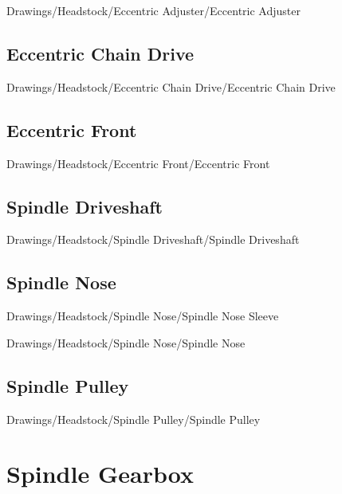
{Drawings/Headstock/Eccentric Adjuster/Eccentric Adjuster}

\subsection{Eccentric Chain Drive}


{Drawings/Headstock/Eccentric Chain Drive/Eccentric Chain Drive}

\subsection{Eccentric Front}


{Drawings/Headstock/Eccentric Front/Eccentric Front}

\subsection{Spindle Driveshaft}


{Drawings/Headstock/Spindle Driveshaft/Spindle Driveshaft}

\subsection{Spindle Nose}


{Drawings/Headstock/Spindle Nose/Spindle Nose Sleeve}


{Drawings/Headstock/Spindle Nose/Spindle Nose}

\subsection{Spindle Pulley}


{Drawings/Headstock/Spindle Pulley/Spindle Pulley}

\section{Spindle Gearbox}

